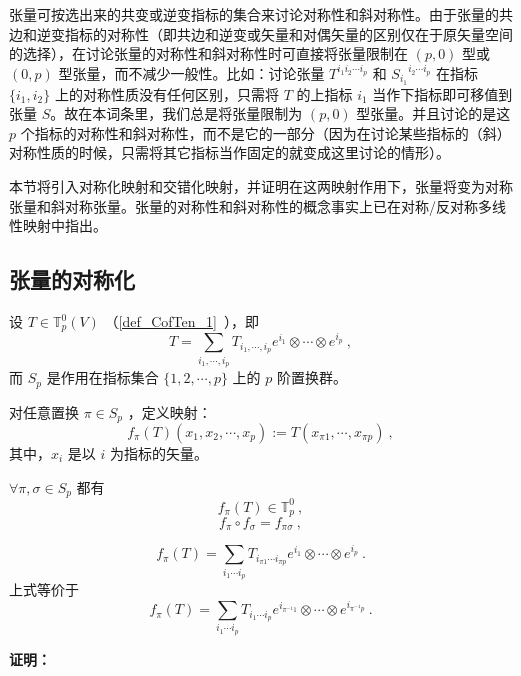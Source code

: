 


张量可按选出来的共变或逆变指标的集合来讨论对称性和斜对称性。由于张量的共边和逆变指标的对称性（即共边和逆变或矢量和对偶矢量的区别仅在于原矢量空间的选择），在讨论张量的对称性和斜对称性时可直接将张量限制在 $(p,0)$ 型或 $(0,p)$ 型张量，而不减少一般性。比如：讨论张量 $T^{i_1 i_2\cdots i_p}$ 和 ${S_{i_1}}^{i_2\cdots i_p}$ 在指标 $\{i_1,i_2\}$ 上的对称性质没有任何区别，只需将 $T$ 的上指标 $i_1$ 当作下指标即可移值到张量 $S$。故在本词条里，我们总是将张量限制为 $(p,0)$ 型张量。并且讨论的是这 $p$ 个指标的对称性和斜对称性，而不是它的一部分（因为在讨论某些指标的（斜）对称性质的时候，只需将其它指标当作固定的就变成这里讨论的情形）。

本节将引入对称化映射和交错化映射，并证明在这两映射作用下，张量将变为对称张量和斜对称张量。张量的对称性和斜对称性的概念事实上已在对称/反对称多线性映射中指出。
\subsection{张量的对称化}
设 $T\in \mathbb{T}_p^0(V)$ （\autoref{def_CofTen_1}~），即
\begin{equation}
T=\sum_{i_1,\cdots,i_p}T_{i_1,\cdots,i_p}e^{i_1}\otimes\cdots\otimes e^{i_p}~,
\end{equation}
而 $S_p$ 是作用在指标集合 $\{1,2,\cdots,p\}$ 上的 $p$ 阶置换群。

对任意置换 $\pi\in S_p$ ，定义映射：
\begin{equation}\label{eq_SIofTe_1}
f_\pi(T)(x_1,x_2,\cdots,x_p):=T(x_{\pi1},\cdots,x_{\pi p})~,
\end{equation}
其中，$x_i$ 是以 $i$ 为指标的矢量。

\begin{theorem}{}
$\forall \pi,\sigma\in S_p$ 都有 
\begin{equation}
f_{\pi}(T)\in\mathbb{T}_p^0~,
\end{equation}
\begin{equation}\label{eq_SIofTe_6}
f_\pi \circ f_\sigma=f_{\pi\sigma}~,
\end{equation}

\begin{equation}\label{eq_SIofTe_2}
f_{\pi}(T)=\sum_{i_1\cdots i_p}T_{i_{\pi1}\cdots i_{\pi p}}e^{i_1}\otimes\cdots\otimes e^{i_p}~.
\end{equation}
上式等价于
\begin{equation}\label{eq_SIofTe_3}
f_{\pi}(T)=\sum_{i_1\cdots i_p}T_{i_1\cdots i_p}e^{i_{\pi^{-1}1}}\otimes\cdots\otimes e^{i_{\pi^{-1}p}}~.
\end{equation}
\end{theorem}
\textbf{证明：}

